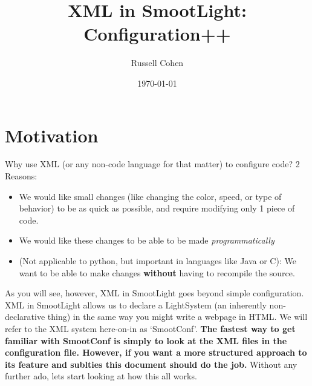 \documentclass{article}
\begin{document}
    \title{XML in SmootLight: Configuration++}
    \author{Russell Cohen}
    \date{\today}
    \maketitle
    \section{Motivation}
        Why use XML (or any non-code language for that matter) to configure code?  2 Reasons: 
        \begin{itemize}
            \item We would like small changes (like changing the color, speed, or type of behavior)
            to be as quick as possible, and require modifying only 1 piece of code.
            \item We would like these changes to be able to be made \emph{programmatically}
            \item (Not applicable to python, but important in languages like Java or C): We want to
            be able to make changes \textbf{without} having to recompile the source.
        \end{itemize}
        As you will see, however, XML in SmootLight goes beyond simple configuration.  XML in
        SmootLight allows us to declare a LightSystem (an inherently non-declarative thing) in the
        same way you might write a webpage in HTML.  We will refer to the XML system here-on-in as
        `SmootConf'.  \textbf{The fastest way to get familiar with SmootConf is simply to look at
        the XML files in the configuration file.  However, if you want a more structured approach to
        its feature and sublties this document should do the job.}  Without any further ado, lets start looking at
        how this all works.
\end{document}
